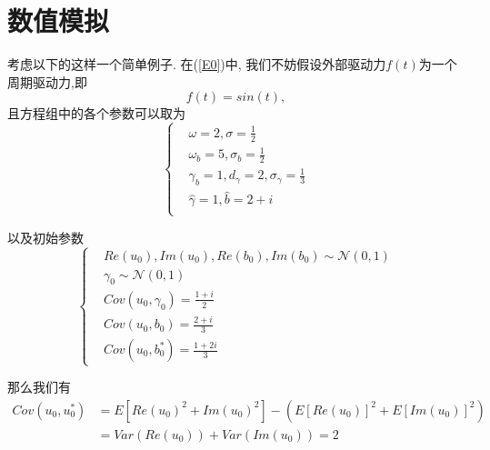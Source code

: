 \documentclass[notitlepage,cs4size,punct,oneside]{ctexrep}
\numberwithin{equation}{section}
\theoremstyle{mystyle}
\begin{document}
\section{数值模拟}
考虑以下的这样一个简单例子. 在(\ref{E0})中, 我们不妨假设外部驱动力$f(t)$为一个周期驱动力,即
$$
f(t) = sin(t),
$$
且方程组中的各个参数可以取为
\begin{equation}
\left\{
\begin{aligned}
&\omega = 2, \sigma = \frac{1}{2} \\
&\omega_b = 5, \sigma_b = \frac{1}{2} \\
&\gamma_b = 1, d_\gamma = 2 , \sigma_\gamma = \frac{1}{3} \\
&\hat\gamma = 1, \hat{b} = 2+i \\
\end{aligned}
\right.
\end{equation}

以及初始参数
\begin{equation}
\left\{
\begin{aligned}
&Re(u_0), Im(u_0), Re(b_0), Im(b_0) \sim \mathcal{N}(0, 1) \\
&\gamma_0 \sim \mathcal{N}(0, 1) \\
&Cov(u_0, \gamma_0) = \frac{1+i}{2} \\
&Cov(u_0, b_0) = \frac{2+i}{3} \\
&Cov(u_0, b_0^*) = \frac{1+2i}{3}
\end{aligned}
\right.
\end{equation}

那么我们有
\begin{equation}
\begin{split}
Cov(u_0, u_0^*) &= E\left[Re(u_0)^2+Im(u_0)^2\right] - \left(E[Re(u_0)]^2+E[Im(u_0)]^2\right) \\
&= Var(Re(u_0))+Var(Im(u_0)) = 2
\end{split}
\end{equation}





\end{document}
